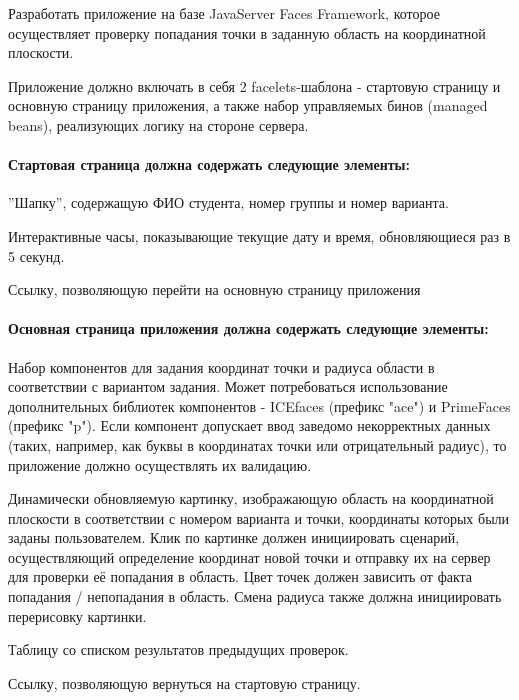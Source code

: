 \documentclass[a4paper, 12pt]{article}
\newenvironment{itemize*}%
  {\begin{itemize}%
    \setlength{\itemsep}{1pt}%
    \setlength{\parskip}{1pt}}%
  {\end{itemize}}
\begin{document}
Разработать приложение на базе JavaServer Faces Framework, которое осуществляет проверку попадания точки в заданную область на координатной плоскости.

Приложение должно включать в себя 2 facelets-шаблона - стартовую страницу и основную страницу приложения, а также набор управляемых бинов (managed beans), реализующих логику на стороне сервера.

\paragraph{Стартовая страница должна содержать следующие элементы:}

\begin{itemize*}
\item ''Шапку'', содержащую ФИО студента, номер группы и номер варианта.
\item Интерактивные часы, показывающие текущие дату и время, обновляющиеся раз в 5 секунд.
\item Ссылку, позволяющую перейти на основную страницу приложения

\end{itemize*}

\paragraph{Основная страница приложения должна содержать следующие элементы:}
\begin{itemize*}
\item Набор компонентов для задания координат точки и радиуса области в соответствии с вариантом задания. Может потребоваться использование дополнительных библиотек компонентов - ICEfaces (префикс "ace") и PrimeFaces (префикс "p"). Если компонент допускает ввод заведомо некорректных данных (таких, например, как буквы в координатах точки или отрицательный радиус), то приложение должно осуществлять их валидацию.
\item Динамически обновляемую картинку, изображающую область на координатной плоскости в соответствии с номером варианта и точки, координаты которых были заданы пользователем. Клик по картинке должен инициировать сценарий, осуществляющий определение координат новой точки и отправку их на сервер для проверки её попадания в область. Цвет точек должен зависить от факта попадания / непопадания в область. Смена радиуса также должна инициировать перерисовку картинки.
\item Таблицу со списком результатов предыдущих проверок.
\item Ссылку, позволяющую вернуться на стартовую страницу.
\end{itemize*}
\end{document}
